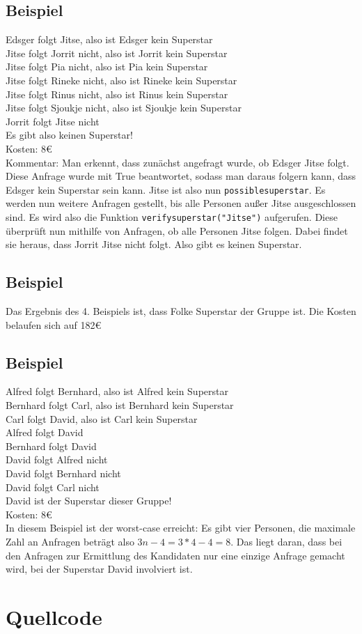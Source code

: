 \documentclass[a4paper,10pt,ngerman]{scrartcl}
\begin{document}
\subsection{Beispiel}
Edsger folgt Jitse, also ist Edsger kein Superstar\\
Jitse folgt Jorrit nicht, also ist Jorrit kein Superstar\\
Jitse folgt Pia nicht, also ist Pia kein Superstar\\
Jitse folgt Rineke nicht, also ist Rineke kein Superstar\\
Jitse folgt Rinus nicht, also ist Rinus kein Superstar\\
Jitse folgt Sjoukje nicht, also ist Sjoukje kein Superstar\\
Jorrit folgt Jitse nicht\\
Es gibt also keinen Superstar!\\
Kosten: 8\euro{}\\
Kommentar: Man erkennt, dass zunächst angefragt wurde, ob Edsger Jitse folgt. Diese Anfrage wurde mit True beantwortet, sodass man daraus folgern kann, dass Edsger kein Superstar sein kann.
Jitse ist also nun \lstinline|possiblesuperstar|. Es werden nun weitere Anfragen gestellt, bis alle Personen außer Jitse ausgeschlossen sind. Es wird also die Funktion \lstinline|verifysuperstar("Jitse")| aufgerufen. Diese überprüft nun mithilfe von Anfragen, ob alle Personen Jitse folgen. Dabei findet sie heraus, dass Jorrit Jitse nicht folgt. Also gibt es keinen Superstar.
\subsection{Beispiel}
Das Ergebnis des 4. Beispiels ist, dass Folke Superstar der Gruppe ist. Die Kosten belaufen sich auf 182\euro{}
\subsection{Beispiel}
Alfred folgt Bernhard, also ist Alfred kein Superstar\\
Bernhard folgt Carl, also ist Bernhard kein Superstar\\
Carl folgt David, also ist Carl kein Superstar\\
Alfred folgt David\\
Bernhard folgt David\\
David folgt Alfred nicht\\
David folgt Bernhard nicht\\
David folgt Carl nicht\\
David ist der Superstar dieser Gruppe!\\
Kosten: 8\euro{}\\
In diesem Beispiel ist der worst-case erreicht: Es gibt vier Personen, die maximale Zahl an Anfragen beträgt also $3n-4=3*4-4=8$. Das liegt daran, dass bei den Anfragen zur Ermittlung des Kandidaten nur eine einzige Anfrage gemacht wird, bei der Superstar David involviert ist.
\section{Quellcode}

\end{document}
